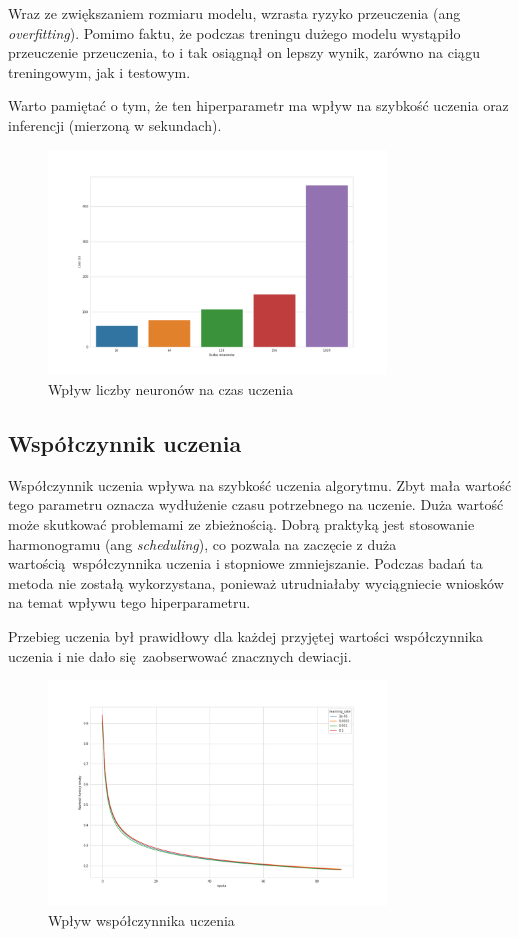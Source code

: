 \documentclass{article}
\begin{document}
Wraz ze zwiększaniem rozmiaru modelu, wzrasta ryzyko 
przeuczenia (ang \textit{overfitting}).
Pomimo faktu, że podczas treningu dużego modelu wystąpiło przeuczenie przeuczenia, to i tak osiągnął on lepszy wynik, zarówno na ciągu treningowym, jak i testowym.


Warto pamiętać o tym, że ten hiperparametr ma wpływ na szybkość uczenia
oraz inferencji (mierzoną w sekundach).
\begin{figure}[H]
  \centering
  \includegraphics[width=0.8\textwidth]{images/hidden_size_times.png}
  \caption{Wpływ liczby neuronów na czas uczenia}
\end{figure}

\subsection{Współczynnik uczenia}
Współczynnik uczenia wpływa na szybkość uczenia algorytmu.
Zbyt mała wartość tego parametru oznacza wydłużenie czasu potrzebnego na uczenie.
Duża wartość może skutkować problemami ze zbieżnością.
Dobrą praktyką jest stosowanie harmonogramu (ang \textit{scheduling}), co pozwala na zaczęcie z duża wartością współczynnika uczenia i stopniowe zmniejszanie.
Podczas badań ta metoda nie zostałą wykorzystana, ponieważ utrudniałaby wyciągniecie wniosków na temat wpływu tego hiperparametru.

Przebieg uczenia był prawidłowy dla każdej przyjętej wartości współczynnika uczenia i nie dało się zaobserwować znacznych dewiacji.
\begin{figure}[H]
  \centering
  \includegraphics[width=0.8\textwidth]{images/learning_rate_comp.png}
  \caption{Wpływ współczynnika uczenia}
\end{figure}
\end{document}

